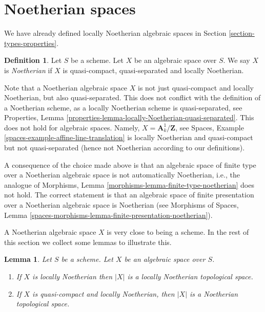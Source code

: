\documentclass{stacks-project}
\theoremstyle{plain}
\newtheorem{lemma}[subsection]{Lemma}
\theoremstyle{definition}
\newtheorem{definition}[subsection]{Definition}
\theoremstyle{remark}
\numberwithin{equation}{subsection}
\begin{document}
\section{Noetherian spaces}
\label{section-noetherian}

\noindent
We have already defined locally Noetherian algebraic spaces in
Section \ref{section-types-properties}.

\begin{definition}
\label{definition-noetherian}
Let $S$ be a scheme. Let $X$ be an algebraic space over $S$.
We say $X$ is {\it Noetherian} if $X$ is quasi-compact, quasi-separated
and locally Noetherian.
\end{definition}

\noindent
Note that a Noetherian algebraic space $X$ is not just quasi-compact
and locally Noetherian, but also quasi-separated. This does not conflict
with the definition of a Noetherian scheme, as a locally Noetherian
scheme is quasi-separated, see
Properties, Lemma \ref{properties-lemma-locally-Noetherian-quasi-separated}.
This does not hold for algebraic spaces. Namely,
$X = \mathbf{A}^1_k/\mathbf{Z}$, see
Spaces, Example \ref{spaces-example-affine-line-translation}
is locally Noetherian and quasi-compact but not quasi-separated
(hence not Noetherian according to our definitions).

\medskip\noindent
A consequence of the choice made above is that an algebraic space
of finite type over a Noetherian algebraic space is not automatically
Noetherian, i.e., the analogue of
Morphisms, Lemma \ref{morphisms-lemma-finite-type-noetherian}
does not hold. The correct statement is that an algebraic space of
finite presentation over a Noetherian algebraic space is Noetherian
(see
Morphisms of Spaces,
Lemma \ref{spaces-morphisms-lemma-finite-presentation-noetherian}).

\medskip\noindent
A Noetherian algebraic space $X$ is very close to being a scheme.
In the rest of this section we collect some lemmas to illustrate this.

\begin{lemma}
\label{lemma-Noetherian-topology}
Let $S$ be a scheme. Let $X$ be an algebraic space over $S$.
\begin{enumerate}
\item If $X$ is locally Noetherian then $|X|$ is a locally Noetherian
topological space.
\item If $X$ is quasi-compact and locally Noetherian, then $|X|$
is a Noetherian topological space.
\end{enumerate}
\end{lemma}
\end{document}
